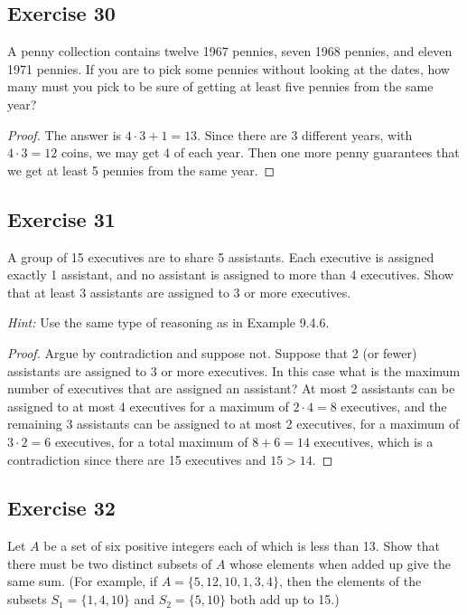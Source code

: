 \documentclass[14pt]{extarticle}
\begin{document}
\subsection{Exercise 30}
A penny collection contains twelve 1967 pennies, seven 1968 pennies, and eleven 1971 pennies. If you are to pick some 
pennies without looking at the dates, how many must you pick to be sure of getting at least five pennies from the 
same year?

\begin{proof}
The answer is \(4 \cdot 3 + 1 = 13\). Since there are 3 different years, with \(4 \cdot 3 = 12\) coins, we may get
4 of each year. Then one more penny guarantees that we get at least 5 pennies from the same year.
\end{proof}

\subsection{Exercise 31}
A group of 15 executives are to share 5 assistants. Each executive is assigned exactly 1 assistant, and no assistant 
is assigned to more than 4 executives. Show that at least 3 assistants are assigned to 3 or more executives.

{\it Hint:} Use the same type of reasoning as in Example 9.4.6.

\begin{proof}
Argue by contradiction and suppose not. Suppose that 2 (or fewer) assistants are assigned to 3 or more executives.
In this case what is the maximum number of executives that are assigned an assistant? At most 2 assistants can be 
assigned to at most 4 executives for a maximum of \(2 \cdot 4 = 8\) executives, and the remaining 3 assistants can be
assigned to at most 2 executives, for a maximum of \(3 \cdot 2 = 6\) executives, for a total maximum of \(8+6=14\)
executives, which is a contradiction since there are 15 executives and \(15 > 14\).
\end{proof}

\subsection{Exercise 32}
Let \(A\) be a set of six positive integers each of which is less than 13. Show that there must be two distinct 
subsets of \(A\) whose elements when added up give the same sum. (For example, if \(A = \{5, 12, 10, 1, 3, 4\}\), then 
the elements of the subsets \(S_1 = \{1, 4, 10\}\) and \(S_2 = \{5, 10\}\) both add up to 15.)
\end{document}
